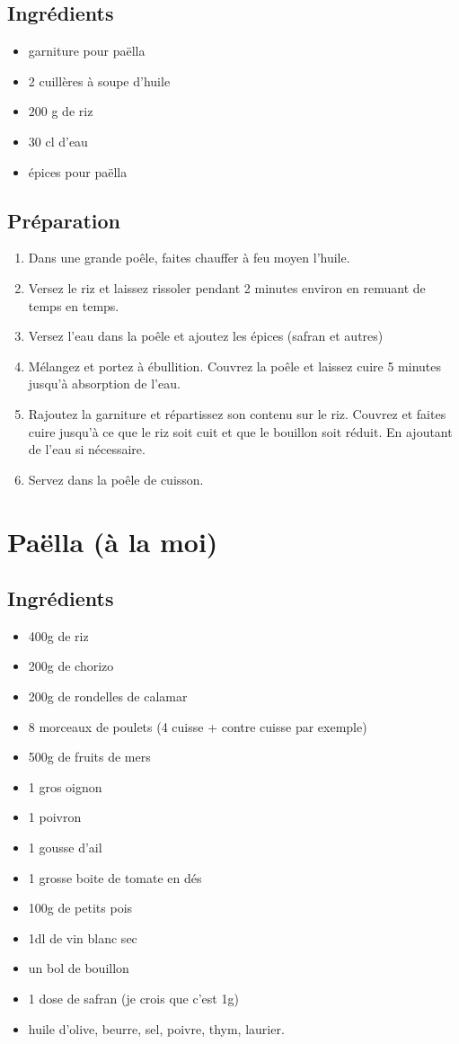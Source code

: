 \subsection*{Ingrédients}
\begin{itemize}
\item garniture pour paëlla
\item 2 cuillères à soupe d'huile
\item $200$ g de riz
\item $30$ cl d'eau
\item épices pour paëlla
\end{itemize}

\subsection*{Préparation}
\begin{enumerate}
\item Dans une grande poêle, faites chauffer à feu moyen l'huile.
\item Versez le riz et laissez rissoler pendant 2 minutes environ en remuant de temps en temps.
\item Versez l'eau dans la poêle et ajoutez les épices (safran et autres)
\item Mélangez et portez à ébullition. Couvrez la poêle et laissez cuire 5 minutes jusqu'à absorption de l'eau.
\item Rajoutez la garniture et répartissez son contenu sur le riz. Couvrez et faites cuire jusqu'à ce que le riz soit cuit et que le bouillon soit réduit. En ajoutant de l'eau si nécessaire.
\item Servez dans la poêle de cuisson.
\end{enumerate}

\newpage
\section{Paëlla (à la moi)}
\subsection*{Ingrédients}
\begin{itemize}
\item 400g de riz
\item 200g de chorizo
\item 200g de rondelles de calamar
\item 8 morceaux de poulets (4 cuisse + contre cuisse par exemple)
\item 500g de fruits de mers
\item 1 gros oignon
\item 1 poivron
\item 1 gousse d'ail
\item 1 grosse boite de tomate en dés
\item 100g de petits pois
\item 1dl de vin blanc sec
\item un bol de bouillon
\item 1 dose de safran (je crois que c'est 1g)
\item huile d'olive, beurre, sel, poivre, thym, laurier.
\end{itemize}

